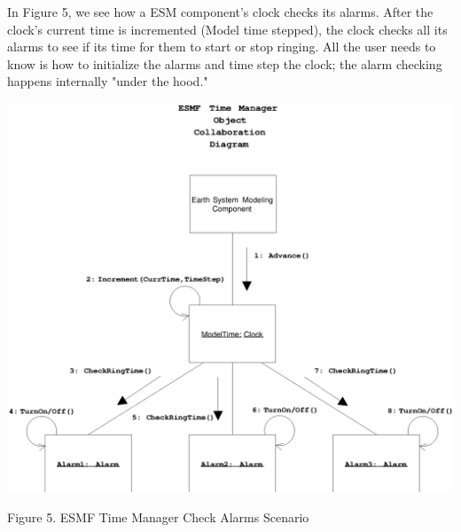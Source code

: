

In Figure 5, we see how a ESM component's clock checks its alarms.  After
the clock's current time is incremented (Model time stepped), the clock checks
all its alarms to see if its time for them to start or stop ringing.  All the
user needs to know is how to initialize the alarms and time step the clock;
the alarm checking happens internally "under the hood."
   
\begin{center}
\includegraphics{TimeMgrOCD3.EPS}
   
Figure 5.  ESMF Time Manager Check Alarms Scenario
   
\end{center}
